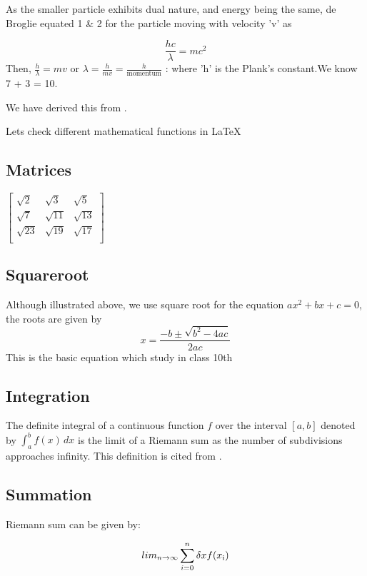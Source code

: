 \documentclass[10pt]{article}
\begin{document}
As the smaller particle exhibits dual nature, and energy being the same, de Broglie equated 1 \& 2 for the particle moving with velocity 'v' as

$$\frac{hc}{\lambda}=mc^2$$
Then, $\frac{h}{\lambda}= mv$ or $\lambda = \frac{h}{mv} = \frac{h}{\text{momentum}}$ : where 'h' is the Plank's constant.We know  7 + 3 = 10.

\noindent We have derived this from \cite{verma2008concepts} .

\noindent Lets check different mathematical functions in \LaTeX

\subsection{Matrices}
$
\begin{bmatrix}
\sqrt{2} & \sqrt{3} & \sqrt{5} \\
\sqrt{7} & \sqrt{11} & \sqrt{13} \\
\sqrt{23} & \sqrt{19} & \sqrt{17} \\
\end{bmatrix}
$

\subsection{Squareroot}
Although illustrated above, we use square root for the equation $ax^2+bx+c=0$, the roots are given by
$$ x = \frac{-b \pm \sqrt{b^2-4ac}}{2ac} $$
This is the basic equation which study in class 10th \cite{education2016mathematics}

\newpage

\subsection{Integration}
The definite integral of a continuous function $f$ over the interval $[a, b]$ denoted by $\int_{a}^{b}f(x) \,dx$ is the limit of a Riemann sum as the number of subdivisions  approaches infinity. This definition is cited from \cite{ghorpade2018course}.

\subsection{Summation}
Riemann sum can be given by:

$$
lim_{n\rightarrow\infty}\displaystyle \sum\limits_{i=0}^n\delta x f(x\textsubscript{i}) 
$$

\end{document}
